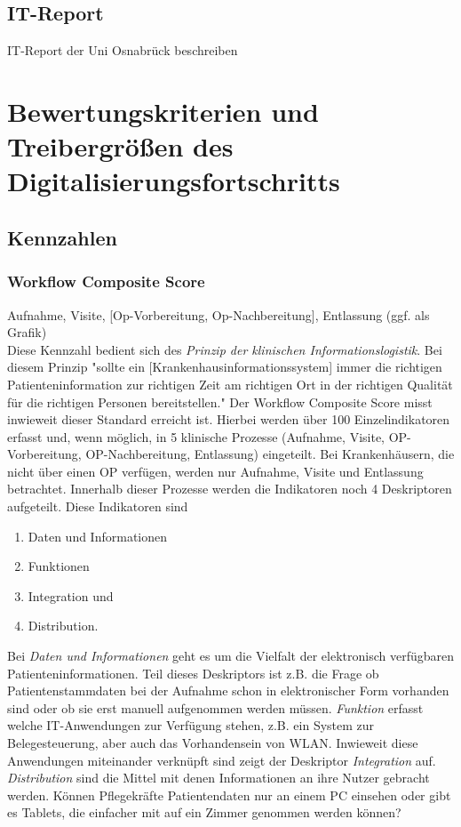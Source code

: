 	\subsection{IT-Report}
	IT-Report der Uni Osnabrück beschreiben
\section{Bewertungskriterien und Treibergrößen des Digitalisierungsfortschritts}
	\subsection{Kennzahlen}
	\subsubsection{Workflow Composite Score}
		Aufnahme, Visite, [Op-Vorbereitung, Op-Nachbereitung], Entlassung (ggf. als Grafik)\\
		Diese Kennzahl bedient sich des \textit{Prinzip der klinischen Informationslogistik}. Bei diesem Prinzip "sollte ein [Krankenhausinformationssystem] immer die richtigen Patienteninformation zur richtigen Zeit am richtigen Ort in der richtigen Qualität für die richtigen Personen bereitstellen."\parencite[36]{huebner2019} Der Workflow Composite Score misst inwieweit dieser Standard erreicht ist. Hierbei werden über 100 Einzelindikatoren erfasst und, wenn möglich, in 5 klinische Prozesse (Aufnahme, Visite, OP-Vorbereitung, OP-Nachbereitung, Entlassung) eingeteilt. Bei Krankenhäusern, die nicht über einen OP verfügen, werden nur Aufnahme, Visite und Entlassung betrachtet. Innerhalb dieser Prozesse werden die Indikatoren noch 4 Deskriptoren aufgeteilt. Diese Indikatoren sind
		\begin{enumerate}
			\item Daten und Informationen
			\item Funktionen
			\item Integration und
			\item Distribution.
		\end{enumerate}
		Bei \textit{Daten und Informationen} geht es um die Vielfalt der elektronisch verfügbaren Patienteninformationen. Teil dieses Deskriptors ist z.B. die Frage ob Patientenstammdaten bei der Aufnahme schon in elektronischer Form vorhanden sind oder ob sie erst manuell aufgenommen werden müssen. \textit{Funktion} erfasst welche IT-Anwendungen zur Verfügung stehen, z.B. ein System zur Belegesteuerung, aber auch das Vorhandensein von WLAN. Inwieweit diese Anwendungen miteinander verknüpft sind zeigt der Deskriptor \textit{Integration} auf. \textit{Distribution} sind die Mittel mit denen Informationen an ihre Nutzer gebracht werden. Können Pflegekräfte Patientendaten nur an einem PC einsehen oder gibt es Tablets, die einfacher mit auf ein Zimmer genommen werden können?


